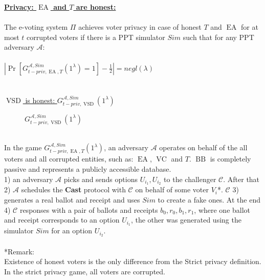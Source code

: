 \documentclass[12pt]{article}
\DeclareMathOperator{\vsd}{VSD}
\DeclareMathOperator{\ea}{EA}
\DeclareMathOperator{\bb}{BB}
\DeclareMathOperator{\voc}{VC}
\begin{document}
\underline{\textbf{Privacy: $\ea$ and $T$ are honest:}}\\\\
The e-voting system $\Pi$ achieves voter privacy in case of honest $T$ and $\ea$  for at most $t$ corrupted voters if there is a PPT simulator $Sim$ such that for any PPT adversary $\mathcal{A}$:\\\\
 $|\Pr[G_{t-priv,\ea,T}^{\mathcal{A}, Sim}(1^{\lambda}) = 1] - \frac{1}{2}| = negl(\lambda)$\\\\\\
\underline{$\vsd$ is honest: $G_{t-priv,\vsd}^{\mathcal{A},Sim}(1^{\lambda})$}\\
     \begin{figure}[h!]
 
        \caption{ $G_{t-priv,\vsd}^{\mathcal{A},Sim}(1^{\lambda})$}
\end{figure}\\

 In the game $G_{t-priv,\ea,T}^{\mathcal{A}, Sim}(1^{\lambda})$, an adversary $\mathcal{A}$  operates on behalf of the all voters and all corrupted entities, such as:  $\ea$, $\voc$ and $T$. $\bb$ is completely passive and represents a publicly accessible database.\\
 1) an adversary $\mathcal{A}$ picks and sends options $U_{i_1}, U_{i_2}$ to the challenger $\mathcal{C}$.  After that 2) $\mathcal{A}$ schedules the \textbf{Cast} protocol with $\mathcal{C}$ on behalf of some voter $V_i$*. $\mathcal{C}$ 3) generates a real ballot and receipt and uses $Sim$ to create a fake ones.  At the end 4) $\mathcal{C}$ responses with a pair of ballots and receipts $b_0,r_0,b_1,r_1$, where one ballot and receipt corresponds to an option $U_{i_1}$, the other was generated using the simulator $Sim$ for an option $U_{i_2}$. \\\\
 *Remark:\\
 Existence of honest voters  is the only difference from the Strict privacy definition. In the strict privacy game, all voters are corrupted. 
 
\end{document}
